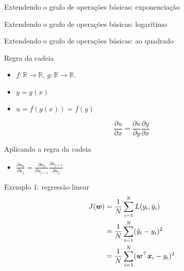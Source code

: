 \documentclass[10pt]{beamer}
\begin{document}
\begin{frame}{Extendendo o grafo de operações básicas: exponenciação}

\end{frame}

\begin{frame}{Extendendo o grafo de operações básicas: logarítimo}

\end{frame}

\begin{frame}{Extendendo o grafo de operações básicas: ao quadrado}

\end{frame}


\begin{frame}{Regra da cadeia}
\Large{
\begin{itemize}
\item $f:\mathbb{R} \rightarrow\mathbb{R}$, $g:\mathbb{R} \rightarrow\mathbb{R}$. 
\item $y = g(x)$
\item $u = f(g(x)) = f(y)$

\end{itemize}



\[
\frac{\partial u}{\partial x} = \frac{\partial u}{\partial y} \frac{\partial y}{\partial x} 
\]
}
\end{frame}

\begin{frame}{Aplicando a regra da cadeia}

\Large{
\begin{itemize}
\item $\frac{\partial u_{n}}{\partial u_{j}} = \frac{\partial u_{n}}{\partial u_{j+1}} \frac{\partial u_{j+1}}{\partial u_{j}}$
\end{itemize}
}

\end{frame}

\begin{frame}{Exemplo 1: regressão linear}
\Large{
\begin{align*}
J(\bm{w}) & = \frac{1}{N}\sum_{i=1}^{N}L(y_{i}, \hat{y}_{i})\\
            & = \frac{1}{N}\sum_{i=1}^{N}(\hat{y}_{i} - y_{i})^{2}\\
            & = \frac{1}{N}\sum_{i=1}^{N}(\bm{w}^\top\bm{x}_{i} - y_{i})^{2}\\
\end{align*}
}
\end{frame}
\end{document}
